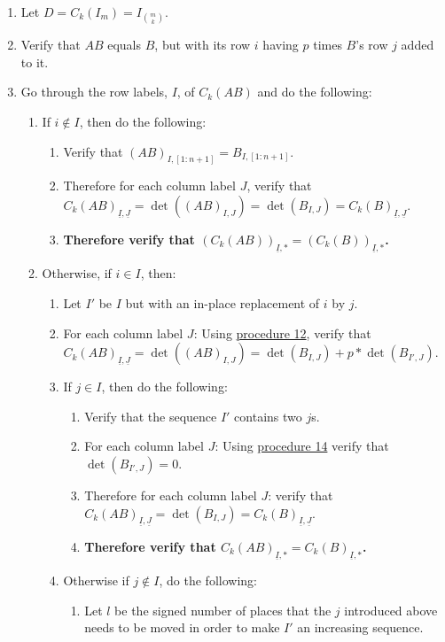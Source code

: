 \documentclass[twocolumn]{article}
\newcommand{\ul}[1]{\underline{#1}}
\begin{document}
				\begin{enumerate}
					\item Let $D=C_k(I_m)=I_{\binom{m}{k}}$.
					\item Verify that $AB$ equals $B$, but with its row $i$ having $p$ times $B$'s row $j$ added to it.
					\item Go through the row labels, $I$, of $C_k(AB)$ and do the following:
					\begin{enumerate}
						\item If $i\notin I$, then do the following:
						\begin{enumerate}
							\item Verify that $(AB)_{I,[1:n+1]}=B_{I,[1:n+1]}$.
							\item Therefore for each column label $J$, verify that ${C_k(AB)}_{\ul{I},\ul{J}}=\det((AB)_{I,J})=\det(B_{I,J})={C_k(B)}_{\ul{I},\ul{J}}$.
							\item \textbf{Therefore verify that $(C_k(AB))_{\ul{I},*}=(C_k(B))_{\ul{I},*}$.}
						\end{enumerate}
						\item Otherwise, if $i\in I$, then:
						\begin{enumerate}
							\item Let $I'$ be $I$ but with an in-place replacement of $i$ by $j$.
							\item For each column label $J$: Using \hyperref[sec:procedure 12]{procedure 12}, verify that ${C_k(AB)}_{\ul{I},\ul{J}}=\det((AB)_{I,J})=\det(B_{I,J})+p*\det(B_{I',J})$.
							\item If $j\in I$, then do the following:
							\begin{enumerate}
								\item Verify that the sequence $I'$ contains two $j$s.
								\item For each column label $J$: Using \hyperref[sec:procedure 14]{procedure 14} verify that $\det(B_{I',J})=0$.
								\item Therefore for each column label $J$: verify that ${C_k(AB)}_{\ul{I},\ul{J}}=\det(B_{I,J})={C_k(B)}_{\ul{I},\ul{J}}$.
								\item \textbf{Therefore verify that ${C_k(AB)}_{\ul{I},*}={C_k(B)}_{\ul{I},*}$.}
							\end{enumerate}
							\item Otherwise if $j\notin I$, do the following:
							\begin{enumerate}
								\item Let $l$ be the signed number of places that the $j$ introduced above needs to be moved in order to make $I'$ an increasing sequence.

\end{enumerate}
\end{enumerate}
\end{enumerate}
\end{enumerate}
\end{document}
